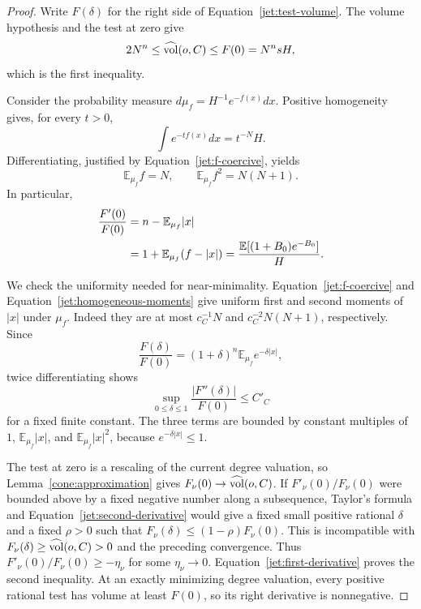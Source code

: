 \begin{proof}
Write $F(\delta)$ for the right side of
Equation~\eqref{jet:test-volume}. The volume hypothesis and the test at
zero give
\[
 2N^n\le\widehat{\operatorname{vol}}(o,C)\le F(0)=N^n sH,
\]
which is the first inequality.

Consider the probability measure $d\mu_f=H^{-1}e^{-f(x)}dx$.
Positive homogeneity gives, for every $t>0$,
\[
 \int e^{-tf(x)}dx=t^{-N}H.
\]
Differentiating, justified by Equation~\eqref{jet:f-coercive}, yields
\begin{equation}\label{jet:homogeneous-moments}
 \mathbb E_{\mu_f}f=N,\qquad
 \mathbb E_{\mu_f}f^2=N(N+1).
\end{equation}
In particular,
\begin{align}
 \frac{F'(0)}{F(0)}
 &=n-\mathbb E_{\mu_f}|x|\notag\\
 &=1+\mathbb E_{\mu_f}(f-|x|)
 =\frac{\mathbb E[(1+B_0)e^{-B_0}]}{H}.
                                           \label{jet:first-derivative}
\end{align}

We check the uniformity needed for near-minimality.
Equation~\eqref{jet:f-coercive} and
Equation~\eqref{jet:homogeneous-moments} give uniform first and second
moments of $|x|$ under $\mu_f$. Indeed they are at most
$c_C^{-1}N$ and $c_C^{-2}N(N+1)$, respectively. Since
\[
 \frac{F(\delta)}{F(0)}
   =(1+\delta)^n\mathbb E_{\mu_f}e^{-\delta|x|},
\]
twice differentiating shows
\begin{equation}\label{jet:second-derivative}
 \sup_{0\le\delta\le1}\frac{|F''(\delta)|}{F(0)}\le C'_C
\end{equation}
for a fixed finite constant. The three terms are bounded by constant
multiples of $1$, $\mathbb E_{\mu_f}|x|$, and
$\mathbb E_{\mu_f}|x|^2$, because $e^{-\delta|x|}\le1$.

The test at zero is a rescaling of the current degree valuation, so
Lemma~\ref{cone:approximation} gives
$F_\nu(0)\to\widehat{\operatorname{vol}}(o,C)$. If $F'_\nu(0)/F_\nu(0)$ were bounded above by
a fixed negative number along a subsequence, Taylor's formula and
Equation~\eqref{jet:second-derivative} would give a fixed small positive
rational $\delta$ and a fixed $\rho>0$ such that
$F_\nu(\delta)\le(1-\rho)F_\nu(0)$. This is incompatible with
$F_\nu(\delta)\ge\widehat{\operatorname{vol}}(o,C)>0$ and the preceding convergence.
Thus $F'_\nu(0)/F_\nu(0)\ge-\eta_\nu$ for some $\eta_\nu\to0$.
Equation~\eqref{jet:first-derivative} proves the second inequality. At
an exactly minimizing degree valuation, every positive rational test
has volume at least $F(0)$, so its right derivative is nonnegative.
\end{proof}

